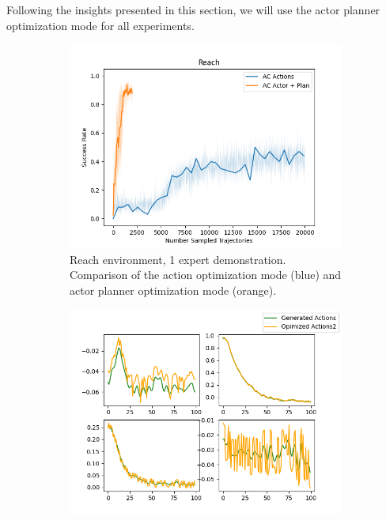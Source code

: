 Following the insights presented in this section, we will use the actor planner optimization mode for all experiments.

\begin{figure}[htbp]
    \centering
    \begin{subfigure}[t]{0.65\textwidth}
      \includegraphics[width=\textwidth]{images/Plan_vs_Actions/Reach.png}
      \caption{Reach environment, 1 expert demonstration. Comparison of the action optimization mode (blue) and actor planner optimization mode (orange).}
      \label{fig:plot1}
    \end{subfigure}
    \medskip
    \begin{subfigure}[t]{0.45\textwidth}
      \includegraphics[width=\textwidth]{images/Plan_vs_Actions/changes/actions_1.png}

\end{subfigure}
\end{figure}

